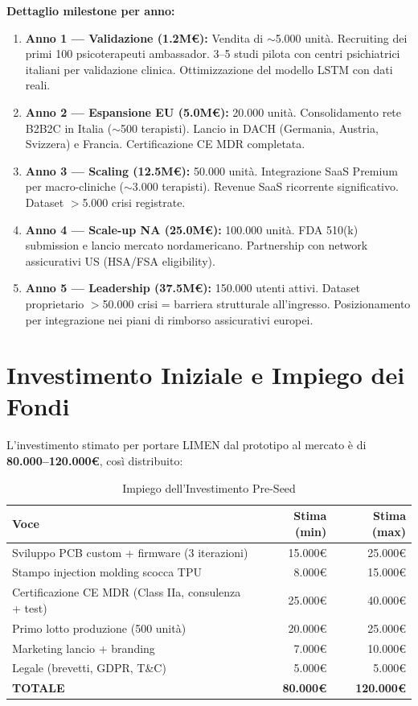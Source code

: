 \documentclass[12pt,a4paper]{article}
\begin{document}
\textbf{Dettaglio milestone per anno:}
\begin{enumerate}
    \item \textbf{Anno 1 --- Validazione (1.2M\euro):} Vendita di $\sim$5.000 unità. Recruiting dei primi 100 psicoterapeuti ambassador. 3--5 studi pilota con centri psichiatrici italiani per validazione clinica. Ottimizzazione del modello LSTM con dati reali.
    \item \textbf{Anno 2 --- Espansione EU (5.0M\euro):} 20.000 unità. Consolidamento rete B2B2C in Italia ($\sim$500 terapisti). Lancio in DACH (Germania, Austria, Svizzera) e Francia. Certificazione CE MDR completata.
    \item \textbf{Anno 3 --- Scaling (12.5M\euro):} 50.000 unità. Integrazione SaaS Premium per macro-cliniche ($\sim$3.000 terapisti). Revenue SaaS ricorrente significativo. Dataset $>$5.000 crisi registrate.
    \item \textbf{Anno 4 --- Scale-up NA (25.0M\euro):} 100.000 unità. FDA 510(k) submission e lancio mercato nordamericano. Partnership con network assicurativi US (HSA/FSA eligibility).
    \item \textbf{Anno 5 --- Leadership (37.5M\euro):} 150.000 utenti attivi. Dataset proprietario $>$50.000 crisi = barriera strutturale all'ingresso. Posizionamento per integrazione nei piani di rimborso assicurativi europei.
\end{enumerate}

\section{Investimento Iniziale e Impiego dei Fondi}
L'investimento stimato per portare LIMEN dal prototipo al mercato è di \textbf{80.000--120.000\euro}, così distribuito:

\begin{table}[h!]
    \centering
    \small
    \caption{Impiego dell'Investimento Pre-Seed}
    \vspace{0.3cm}
    \begin{tabularx}{\textwidth}{@{}X r r@{}}
        \toprule
        \textbf{Voce} & \textbf{Stima (min)} & \textbf{Stima (max)} \\ \midrule
        Sviluppo PCB custom + firmware (3 iterazioni) & 15.000\euro & 25.000\euro \\
        Stampo injection molding scocca TPU & 8.000\euro & 15.000\euro \\
        Certificazione CE MDR (Class IIa, consulenza + test) & 25.000\euro & 40.000\euro \\
        Primo lotto produzione (500 unità) & 20.000\euro & 25.000\euro \\
        Marketing lancio + branding & 7.000\euro & 10.000\euro \\
        Legale (brevetti, GDPR, T\&C) & 5.000\euro & 5.000\euro \\
        \midrule
        \textbf{TOTALE} & \textbf{80.000\euro} & \textbf{120.000\euro} \\
        \bottomrule
    \end{tabularx}
\end{table}
\end{document}
